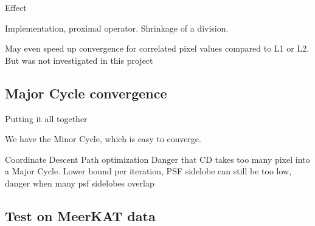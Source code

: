 Effect

Implementation, proximal operator. Shrinkage of a division.



May even speed up convergence for correlated pixel values compared to L1 or L2\cite{friedman2010regularization}. But was not investigated in this project

\subsection{Major Cycle convergence}
Putting it all together

We have the Minor Cycle, which is easy to converge.

Coordinate Descent Path optimization \cite{friedman2010regularization}
Danger that CD takes too many pixel into a Major Cycle. Lower bound per iteration, PSF sidelobe
  can still be too low, danger when many psf sidelobes overlap

\subsection{Test on MeerKAT data}


